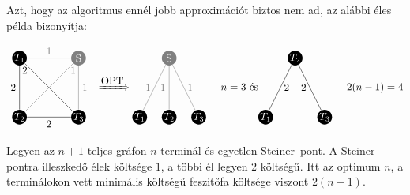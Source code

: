 Azt, hogy az algoritmus ennél jobb approximációt biztos nem ad, az alábbi éles
példa bizonyítja:

\[
	\parbox[l]{3cm}{
	\begin{tikzpicture}[scale=1]
	\tikzset{ p/.style={circle,white,fill=gray,inner sep=0pt,minimum size=0.5cm},
	}
	\node[p,fill=black] (T1) at (-1,  1) {$T_1$};
	\node[p,fill=black] (T2) at (-1, -1) {$T_2$};
	\node[p,fill=black] (T3) at (+1 , -1) {$T_3$};
	\node[p] (S) at (+1 , 1) {S};

	\draw[-] (T1) -- (T3) node [at start, below] {$2$};
	\draw[-] (T1) -- (T2) node [midway, left] {$2$};
	\draw[-] (T2) -- (T3) node [midway, below] {$2$};

	\draw[-,gray] (T1) -- (S) node [midway, above] {$1$};
	\draw[-,gray] (T2) -- (S) node [at end, below] {$1$};
	\draw[-,gray] (T3) -- (S) node [midway, right] {$1$};
	\end{tikzpicture}
	}
	\xRightarrow{\mbox{OPT}}
	\parbox[l]{3cm}{
	\begin{tikzpicture}[scale=1]
	\tikzset{ p/.style={circle,white,fill=gray,inner sep=0pt,minimum size=0.5cm},
	}
	\node[p,fill=black] (T1) at (-1,  0) {$T_1$};
	\node[p,fill=black] (T2) at (0, 0) {$T_2$};
	\node[p,fill=black] (T3) at (+1 , 0) {$T_3$};
	\node[p] (S) at (0 , 2) {S};

	\draw[-,gray] (T1) -- (S) node [midway, left] {$1$};
	\draw[-,gray] (T2) -- (S) node [midway, left] {$1$};
	\draw[-,gray] (T3) -- (S) node [midway, right] {$1$};
	\end{tikzpicture}
	}
	n=3 \mbox{ és}
	\parbox[l]{3cm}{
	\begin{tikzpicture}[scale=1]
	\tikzset{ p/.style={circle,white,fill=gray,inner sep=0pt,minimum size=0.5cm},
	}
	\node[p,fill=black] (T1) at (-1,  0) {$T_1$};
	\node[p,fill=black] (T2) at (0, 2) {$T_2$};
	\node[p,fill=black] (T3) at (+1 , 0) {$T_3$};

	\draw[-] (T1) -- (T2) node [midway, right] {$2$};
	\draw[-] (T2) -- (T3) node [midway, left] {$2$};
	\end{tikzpicture}
	}2(n-1)=4
\]

Legyen az $n+1$ teljes gráfon $n$ terminál és egyetlen Steiner--pont. A
Steiner--pontra illeszkedő élek költsége $1$, a többi él legyen $2$ költségű.
Itt az optimum $n$, a terminálokon vett minimális költségű feszitőfa költsége
viszont $2(n-1)$.
